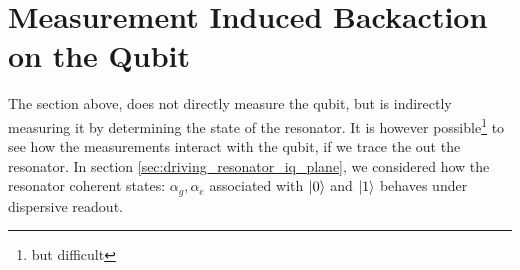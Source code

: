 

\section{Measurement Induced Backaction on the Qubit}\label{sec:qubit_backaction}
The section above, does not directly measure the qubit, but is indirectly measuring it by determining the state of the resonator. It is however possible\footnote{but difficult} to see how the measurements interact with the qubit, if we trace the out the resonator. In section \ref{sec:driving_resonator_iq_plane}, we considered how the resonator coherent states: $\alpha_g, \alpha_e$ associated with $\ket{0}$ and $\ket{1}$ behaves under dispersive readout. 


